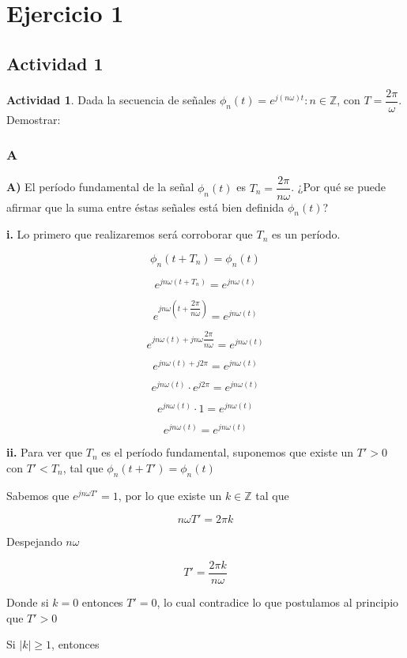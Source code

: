 \chapter{Ejercicio 1}

\section{Actividad 1}

\textbf{Actividad 1}. Dada la secuencia de se\~nales {$\phi_{n} (t)=e^{j(n\omega)t}: n \in \mathbb{Z}$}, con $T = \dfrac{2\pi}{\omega}$. Demostrar:

\subsection{A}

\textbf{A)} El per\'iodo fundamental de la se\~nal $\phi_{n}(t)$ es $T_n=\dfrac{2\pi}{n\omega}$. ¿Por qué se puede afirmar que la suma entre \'estas señales está bien definida $\phi_{n}(t)$?

\textbf{i.} Lo primero que realizaremos ser\'a corroborar que $T_n$ es un per\'iodo.

$$\phi_{n}(t+T_n)=\phi_{n}(t)$$

$$e^{jn\omega(t+T_n)}=e^{jn\omega(t)}$$

$$e^{jn\omega(t+\dfrac{2\pi}{n\omega})}=e^{jn\omega(t)}$$

$$e^{jn\omega(t)+jn\omega\dfrac{2\pi}{n\omega}}=e^{jn\omega(t)}$$

$$e^{jn\omega(t)+j2\pi}=e^{jn\omega(t)}$$

$$e^{jn\omega(t)} \cdot e^{j2\pi} = e^{jn\omega(t)}$$

$$e^{jn\omega(t)} \cdot 1 = e^{jn\omega(t)}$$

$$e^{jn\omega(t)} = e^{jn\omega(t)}$$

\textbf{ii.} Para ver que $T_n$ es el per\'iodo fundamental, suponemos que existe un $T'>0$ con $T'<T_n$, tal que $\phi_n(t+T')=\phi_n(t)$

Sabemos que $e^{jn\omega T'} = 1$, por lo que existe un $k \in \mathbb{Z}$ tal que

$$n\omega T'= 2\pi k$$

Despejando $n\omega$

$$T'=\dfrac{2\pi k}{n\omega}$$

Donde si $k=0$ entonces $T'=0$, lo cual contradice lo que postulamos al principio que $T'>0$

Si $|k| \ge 1$, entonces

